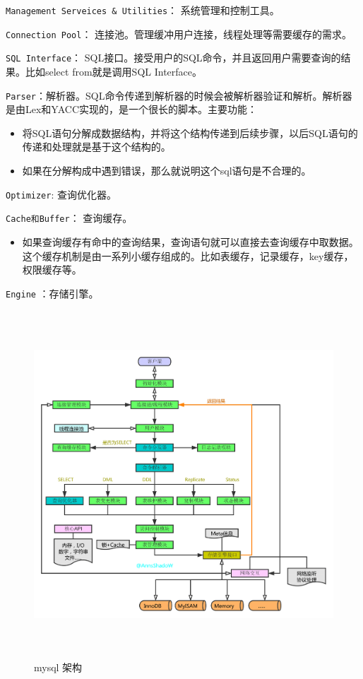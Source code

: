 \documentclass[UTF8,a4paper,12pt]{ctexbook}
\begin{document}
			\verb|Management Serveices & Utilities|： 系统管理和控制工具。
			
			\verb|Connection Pool|： 连接池。管理缓冲用户连接，线程处理等需要缓存的需求。
			
			\verb|SQL Interface|： SQL接口。接受用户的SQL命令，并且返回用户需要查询的结果。比如select from就是调用SQL Interface。
			
			\verb|Parser|：解析器。SQL命令传递到解析器的时候会被解析器验证和解析。解析器是由Lex和YACC实现的，是一个很长的脚本。主要功能：
				\begin{itemize}[itemindent = 1em]
					\item 将SQL语句分解成数据结构，并将这个结构传递到后续步骤，以后SQL语句的传递和处理就是基于这个结构的。
					\item 如果在分解构成中遇到错误，那么就说明这个sql语句是不合理的。
				\end{itemize}
			
			\verb|Optimizer|: 查询优化器。
			
			\verb|Cache和Buffer|： 查询缓存。
				\begin{itemize}[itemindent = 1em]
					\item 如果查询缓存有命中的查询结果，查询语句就可以直接去查询缓存中取数据。这个缓存机制是由一系列小缓存组成的。比如表缓存，记录缓存，key缓存，权限缓存等。
				\end{itemize}
			
			\verb|Engine| ：存储引擎。
			
			
			\begin{figure}[H]
				\centering
				\includegraphics[width=17cm,height= 13cm]{mysqlArch}
				\caption{mysql 架构}
			\end{figure} 			
			
\end{document}
